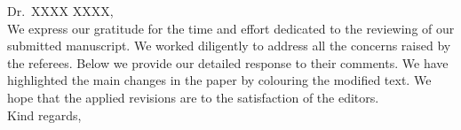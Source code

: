 \noindent Dr.\ XXXX XXXX,
\\[1.5em]

\noindent We express our gratitude for the time and effort dedicated to the reviewing of our submitted manuscript. We worked diligently to address all the concerns raised by the referees. Below we provide our detailed response to their comments.
We have highlighted the main changes in the paper by colouring the modified text.
We hope that the applied revisions are to the satisfaction of the editors.
\\[1.5em]
Kind regards,
\begin{flushright}
\AuthorsInLetter
\end{flushright}